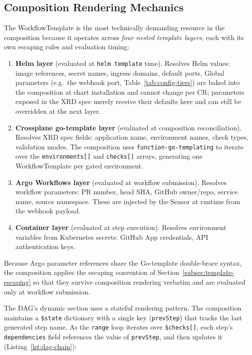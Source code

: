 \subsection{Composition Rendering Mechanics}
\label{subsec:rendering-mechanics}

The WorkflowTemplate is the most technically demanding resource in the composition because it operates across \textit{four nested template layers}, each with its own escaping rules and evaluation timing:

\begin{enumerate}
    \item \textbf{Helm layer} (evaluated at \texttt{helm template} time). Resolves Helm values: image references, secret names, ingress domains, default ports. Global parameters (e.g.\ the webhook port, Table~\ref{tab:config-tiers}) are baked into the composition at chart installation and cannot change per CR; parameters exposed in the XRD spec merely receive their defaults here and can still be overridden at the next layer.
    \item \textbf{Crossplane go-template layer} (evaluated at composition reconciliation). Resolves XRD spec fields: application name, environment names, check types, validation modes. The composition uses \texttt{function-\allowbreak go-templating} to iterate over the \texttt{environments[]} and \texttt{checks[]} arrays, generating one WorkflowTemplate per gated environment.
    \item \textbf{Argo Workflows layer} (evaluated at workflow submission). Resolves workflow parameters: PR number, head SHA, GitHub owner/repo, service name, source namespace. These are injected by the Sensor at runtime from the webhook payload.
    \item \textbf{Container layer} (evaluated at step execution). Resolves environment variables from Kubernetes secrets: GitHub App credentials, API authentication keys.
\end{enumerate}

Because Argo parameter references share the Go-template double-brace syntax, the composition applies the escaping convention of Section~\ref{subsec:template-escaping} so that they survive composition rendering verbatim and are evaluated only at workflow submission.

The DAG's dynamic section uses a stateful rendering pattern. The composition maintains a \texttt{\$state} dictionary with a single key (\texttt{prevStep}) that tracks the last generated step name. As the \texttt{range} loop iterates over \texttt{\$checks[]}, each step's \texttt{dependencies} field references the value of \texttt{prevStep}, and then updates it (Listing~\ref{lst:dag-chain}):

